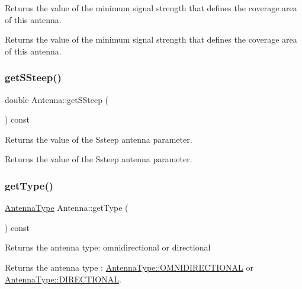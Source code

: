 Returns the value of the minimum signal strength that defines the coverage area of this antenna. \begin{DoxyReturn}{Returns}
the value of the minimum signal strength that defines the coverage area of this antenna. 
\end{DoxyReturn}
\mbox{\label{class_antenna_a096deca0fe8497c0fe53539ae80f2db5}} 
\subsubsection{\texorpdfstring{getSSteep()}{getSSteep()}}
{\footnotesize\ttfamily double Antenna\+::get\+S\+Steep (\begin{DoxyParamCaption}{ }\end{DoxyParamCaption}) const}

Returns the value of the Ssteep antenna parameter. \begin{DoxyReturn}{Returns}
the value of the Ssteep antenna parameter. 
\end{DoxyReturn}
\mbox{\label{class_antenna_adf45a8b339956741bf8dcb5361f5f249}} 
\subsubsection{\texorpdfstring{getType()}{getType()}}
{\footnotesize\ttfamily \mbox{\hyperlink{_antenna_type_8h_a7b678b5cb9dedc607131200119d96b16}{Antenna\+Type}} Antenna\+::get\+Type (\begin{DoxyParamCaption}{ }\end{DoxyParamCaption}) const}

Returns the antenna type\+: omnidirectional or directional \begin{DoxyReturn}{Returns}
the antenna type \+: \mbox{\hyperlink{_antenna_type_8h_a7b678b5cb9dedc607131200119d96b16a8ff57fa72952e98025e600a041b8b8de}{Antenna\+Type\+::\+O\+M\+N\+I\+D\+I\+R\+E\+C\+T\+I\+O\+N\+AL}} or \mbox{\hyperlink{_antenna_type_8h_a7b678b5cb9dedc607131200119d96b16ab6f2249394a4def60a78b342dcc925b9}{Antenna\+Type\+::\+D\+I\+R\+E\+C\+T\+I\+O\+N\+AL}}. 
\end{DoxyReturn}
\mbox{\label{class_antenna_a8270b1a03b61af1e048650e00a129b93}} 
